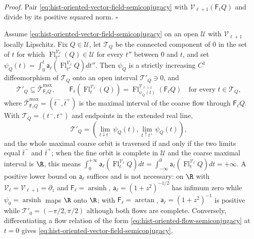 \noindent\emph{Proof.}
Pair \eqref{eq:hist-oriented-vector-field-semiconjugacy} with
$\mathscr V_{\ell+1}(\mathsf F_\ell Q)$ and divide by its positive squared norm.
$\square$

\label{prop:hist-oriented-semiconjugacy}%
Assume \eqref{eq:hist-oriented-vector-field-semiconjugacy} on an open $\mathcal U$ with
$\mathscr V_{\ell+1}$ locally Lipschitz.  Fix $Q\in\mathcal U$, let $\mathcal T_Q$ be the
connected component of $0$ in the set of $t$ for which
$\operatorname{Fl}^{\mathscr V_\ell}_{t''}(Q)\in\mathcal U$ for every $t''$ between $0$
and $t$, and set $\psi_Q(t)=\int_0^t\mathsf a_\ell(\operatorname{Fl}^{\mathscr
V_\ell}_{t''}Q) dt''$.  Then $\psi_Q$ is a strictly increasing $C^1$ diffeomorphism of
$\mathcal T_Q$ onto an open interval $\mathcal T'_Q\ni0$, and
\begin{equation}
\mathcal T'_Q\subseteq\bar{\mathcal T}^{\max}_{\mathsf F_\ell Q},
\qquad
\mathsf F_\ell\left(\operatorname{Fl}^{\mathscr V_\ell}_t(Q)\right)
=\operatorname{Fl}^{\mathscr V_{\ell+1}}_{\psi_Q(t)}\left(\mathsf F_\ell Q\right)
\quad\text{for every }t\in\mathcal T_Q,
\label{eq:hist-oriented-flow-semiconjugacy}
\end{equation}
where $\bar{\mathcal T}^{\max}_{\mathsf F_\ell Q}=(\bar t^-,\bar t^+)$ is the maximal
interval of the coarse flow through $\mathsf F_\ell Q$.  With $\mathcal T_Q=(t^-,t^+)$
and endpoints in the extended real line,
\begin{equation}
\mathcal T'_Q
=\left(
\lim_{t\downarrow t^-}\psi_Q(t),
\lim_{t\uparrow t^+}\psi_Q(t)
\right),
\label{eq:hist-semiconjugacy-endpoint-image}
\end{equation}
and the whole maximal coarse orbit is traversed if and only if the two limits equal
$\bar t^-$ and $\bar t^+$; when the fine orbit is complete in $\mathcal U$ and the coarse
maximal interval is $\R$, this means
$\int_0^{+\infty}\mathsf a_\ell(\operatorname{Fl}^{\mathscr V_\ell}_{t}Q)dt
=\int_{-\infty}^{0}\mathsf a_\ell(\operatorname{Fl}^{\mathscr V_\ell}_{t}Q)dt=+\infty$.
A positive lower bound on $\mathsf a_\ell$ suffices and is not necessary: on $\R$ with
$\mathscr V_\ell=\mathscr V_{\ell+1}=\partial_z$ and
$\mathsf F_\ell=\operatorname{arsinh}$, $\mathsf a_\ell=(1+z^2)^{-1/2}$ has infimum zero
while $\psi_0=\operatorname{arsinh}$ maps $\R$ onto $\R$; with $\mathsf F_\ell=\arctan$,
$\mathsf a_\ell=(1+z^2)^{-1}$ is positive while $\mathcal T'_0=(-\pi/2,\pi/2)$ although
both flows are complete.  Conversely, differentiating a flow relation of the form
\eqref{eq:hist-oriented-flow-semiconjugacy} at $t=0$ gives
\eqref{eq:hist-oriented-vector-field-semiconjugacy}.  

